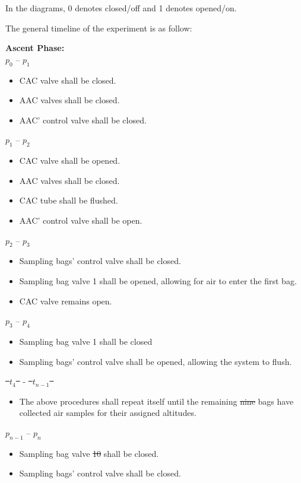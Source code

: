 \documentclass[a4paper,12pt,twoside]{article}
\providecommand{\DIFaddtex}[1]{{\protect\color{blue}\uwave{#1}}} %
\providecommand{\DIFdeltex}[1]{{\protect\color{red}\sout{#1}}}                      %
\providecommand{\DIFaddbegin}{} %
\providecommand{\DIFaddend}{} %
\providecommand{\DIFdelbegin}{} %
\providecommand{\DIFdelend}{} %
\providecommand{\DIFadd}[1]{\texorpdfstring{\DIFaddtex{#1}}{#1}} %
\providecommand{\DIFdel}[1]{\texorpdfstring{\DIFdeltex{#1}}{}} %
\newcommand{\DIFscaledelfig}{0.5}
\newlength{\DIFdelgraphicswidth} %
\newlength{\DIFdelgraphicsheight} %
\newcommand{\DIFaddincludegraphics}[2][]{{\color{blue}\fbox{\DIFOincludegraphics[#1]{#2}}}} %
\newcommand{\DIFdelincludegraphics}[2][]{%
\sbox{\DIFdelgraphicsbox}{\DIFOincludegraphics[#1]{#2}}%
\settoboxwidth{\DIFdelgraphicswidth}{\DIFdelgraphicsbox} %
\settoboxtotalheight{\DIFdelgraphicsheight}{\DIFdelgraphicsbox} %
\scalebox{\DIFscaledelfig}{%
\parbox[b]{\DIFdelgraphicswidth}{\usebox{\DIFdelgraphicsbox}\\[-\baselineskip] \rule{\DIFdelgraphicswidth}{0em}}\llap{\resizebox{\DIFdelgraphicswidth}{\DIFdelgraphicsheight}{%
\setlength{\unitlength}{\DIFdelgraphicswidth}%
\begin{picture}(1,1)%
\thicklines\linethickness{2pt} %
{\color[rgb]{1,0,0}\put(0,0){\framebox(1,1){}}}%
{\color[rgb]{1,0,0}\put(0,0){\line( 1,1){1}}}%
{\color[rgb]{1,0,0}\put(0,1){\line(1,-1){1}}}%
\end{picture}%
}\hspace*{3pt}}} %
} %
\DeclareRobustCommand{\DIFaddbegin}{\DIFOaddbegin \let\includegraphics\DIFaddincludegraphics} %
\DeclareRobustCommand{\DIFaddend}{\DIFOaddend \let\includegraphics\DIFOincludegraphics} %
\DeclareRobustCommand{\DIFdelbegin}{\DIFOdelbegin \let\includegraphics\DIFdelincludegraphics} %
\DeclareRobustCommand{\DIFdelend}{\DIFOaddend \let\includegraphics\DIFOincludegraphics} %
\begin{document}
In the diagrams, 0 denotes closed/off and 1 denotes opened/on.

The general timeline of the experiment is as follow:

\textbf{Ascent Phase:}\\
$p_0$ – $p_1$
\begin{itemize}
    \item CAC valve shall be closed.
    \item AAC valves shall be closed.
    \item AAC' control valve shall be closed.
    \end{itemize}
$p_1$ – $p_2$
\begin{itemize}
    \item CAC valve shall be opened.
    \item AAC valves shall be closed.
    \item CAC tube shall be flushed.
    \item AAC' control valve shall be open.
    \end{itemize}
$p_2$ – $p_3$
\begin{itemize}
    \item Sampling bags' control valve shall be closed.
    \item Sampling bag valve 1 shall be opened, allowing for air to enter the first bag.
    \item CAC valve remains open.
    \end{itemize}
$p_3$ – $p_4$
\begin{itemize}
    \item Sampling bag valve 1 shall be closed
    \item Sampling bags' control valve shall be opened, allowing the system to flush. 
    \end{itemize}
\DIFdelbegin \DIFdel{\mbox{%
$t_4$
}%
}\DIFdelend \DIFaddbegin \DIFadd{\mbox{%
$p_4$
}%
}\DIFaddend - \DIFdelbegin \DIFdel{\mbox{%
$t_{n-1}$
}%
}\DIFdelend \DIFaddbegin \DIFadd{\mbox{%
$p_{n-1}$
}%
}\DIFaddend \begin{itemize}
    \item The above procedures shall repeat itself until the remaining \DIFdelbegin \DIFdel{nine }\DIFdelend \DIFaddbegin \DIFadd{five }\DIFaddend bags have collected air samples for their assigned altitudes.
    \end{itemize}
$p_{n-1}$ – $p_n$
\begin{itemize}
    \item Sampling bag valve \DIFdelbegin \DIFdel{10 }\DIFdelend \DIFaddbegin \DIFadd{6 }\DIFaddend shall be closed.
    \item Sampling bags' control valve shall be closed.
\end{itemize}
\end{document}
